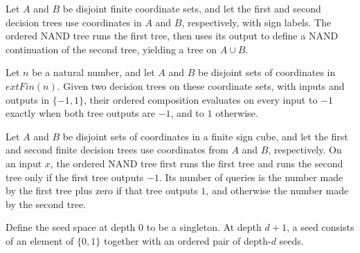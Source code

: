 \begin{definition}
\label{FABL.orderedNandTree}
\leanok
{}
Let $A$ and $B$ be disjoint finite coordinate sets, and let the first and second
decision trees use coordinates in $A$ and $B$, respectively, with sign labels. The
ordered NAND tree runs the first tree, then uses its output to define a NAND
continuation of the second tree, yielding a tree on $A\cup B$.
\end{definition}

\begin{theorem}
\label{FABL.eval_orderedNandTree}
\leanok
{}
Let $n$ be a natural number, and let $A$ and $B$ be disjoint sets of coordinates in
$	ext{Fin}(n)$. Given two decision trees on these coordinate sets, with inputs and
outputs in $\{ -1,1\}$, their ordered composition evaluates on every input to $-1$
exactly when both tree outputs are $-1$, and to $1$ otherwise.
\end{theorem}

\begin{theorem}
\label{FABL.queryCount_orderedNandTree}
\leanok
{}
Let $A$ and $B$ be disjoint sets of coordinates in a finite sign cube, and let the first
and second finite decision trees use coordinates from $A$ and $B$, respectively. On an
input $x$, the ordered NAND tree first runs the first tree and runs the second tree only
if the first tree outputs $-1$. Its number of queries is the number made by the first
tree plus zero if that tree outputs $1$, and otherwise the number made by the second
tree.
\end{theorem}

\begin{definition}
\label{FABL.RecursiveNandSeed}
\leanok
Define the seed space at depth $0$ to be a singleton. At depth $d+1$, a seed consists of
an element of $\{0,1\}$ together with an ordered pair of depth-$d$ seeds.
\end{definition}

